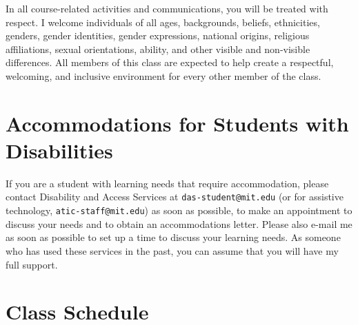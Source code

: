 \documentclass[letterpaper]{inzane_syllabus} %
\begin{document}
In all course-related activities and communications, you will be treated with respect.
I welcome individuals of all ages, backgrounds, beliefs, ethnicities, genders, gender identities, gender expressions, national origins, religious affiliations, sexual orientations, ability, and other visible and non-visible differences.
All members of this class are expected to help create a respectful, welcoming, and inclusive environment for every other member of the class.

\vspace{0.5cm}
\section{Accommodations for Students with Disabilities}

If you are a student with learning needs that require accommodation, please contact Disability and Access Services at \texttt{das-student@mit.edu} (or for assistive technology, \texttt{atic-staff@mit.edu}) as soon as possible, to make an appointment to discuss your needs and to obtain an accommodations letter.
Please also e-mail me as soon as possible to set up a time to discuss your learning needs.
As someone who has used these services in the past, you can assume that you will have my full support.


\newpage
\makeFullPage
\section{Class Schedule}
\end{document}
